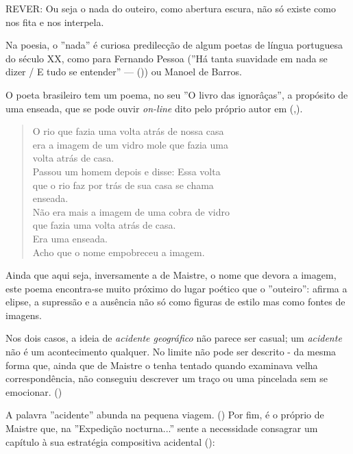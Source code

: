\documentclass[12pt]{article}
\newenvironment{citacao}
{\begin{quote}
    \begin{small}
      \itshape
      \linespread{1}
}
{\end{small}\end{quote}}
\begin{document}
\doublespacing

REVER: Ou seja o nada do outeiro, como abertura escura, não só existe como
nos fita e nos interpela.

Na poesia, o ''nada'' é curiosa predilecção de algum poetas de língua
portuguesa do século XX, como para Fernando Pessoa (''Há tanta
suavidade em nada se dizer / E tudo se entender'' — (\cite{pessoa})) ou
Manoel de Barros.

O poeta brasileiro tem um poema, no seu ''O livro das ignorâças'', a
propósito de uma enseada, que se pode ouvir \emph{on-line} dito pelo
próprio autor em (\cite{avidaebreve},\cite{manoel}).

\singlespacing

\begin{citacao}
  O rio que fazia uma volta atrás de nossa casa\\
era a imagem de um vidro mole que fazia uma\\
volta atrás de casa.\\
Passou um homem depois e disse: Essa volta\\
que o rio faz por trás de sua casa se chama\\
enseada.\\
Não era mais a imagem de uma cobra de vidro\\
que fazia uma volta atrás de casa.\\
Era uma enseada.\\

Acho que o nome empobreceu a imagem. \\
\end{citacao}

\doublespacing

Ainda que aqui seja, inversamente a de Maistre, o nome que devora a
imagem, este poema encontra-se muito próximo do lugar poético que o
''outeiro'': afirma a elipse, a supressão e a ausência não só como
figuras de estilo mas como fontes de imagens.

Nos dois casos, a ideia de \emph{acidente geográfico} não parece ser
casual; um \emph{acidente} não é um acontecimento qualquer. No limite
não pode ser descrito - da mesma forma que, ainda que de Maistre o
tenha tentado quando examinava velha correspondência, não conseguiu
descrever um traço ou uma pincelada sem se
emocionar. (\cite[p.xxx?]{demaistre})

A palavra ''acidente'' abunda na pequena viagem. (\cite[pxxx, pxxx,
  pxxx, pxxx, pxxx]{demaistre}) Por fim, é o próprio de Maistre que,
na ''Expedição nocturna...''  sente a necessidade consagrar um
capítulo à sua estratégia compositiva acidental
(\cite[p.xxx?]{demaistre}):
\end{document}
